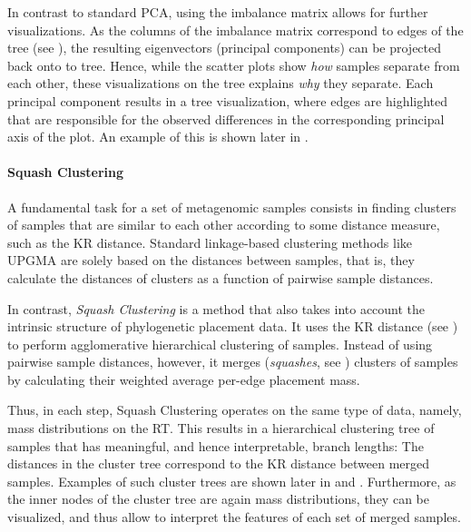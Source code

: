 In contrast to standard PCA, using the imbalance matrix allows for further visualizations.
As the columns of the imbalance matrix correspond to edges of the tree
(see ),
the resulting eigenvectors (principal components) can be projected back onto to tree.
Hence, while the scatter plots show \emph{how} samples separate from each other,
these visualizations on the tree explains \emph{why} they separate.
Each principal component results in a tree visualization,
where edges are highlighted that are responsible for the observed differences
in the corresponding principal axis of the plot.
An example of this is shown later in .

\paragraph{Squash Clustering}
\label{ch:Foundations:sec:PhylogeneticPlacement:sub:ExistingMethods:par:SquashClustering}


A fundamental task for a set of metagenomic samples consists in
finding clusters of samples that are similar to each other according to some distance measure, such as the KR distance.
Standard linkage-based clustering methods like \mbox{UPGMA} %
are solely based on the distances between samples,
that is, they calculate the distances of clusters as a function of pairwise sample distances.

In contrast, \emph{Squash Clustering} \cite{Matsen2011a} is a method that
also takes into account the intrinsic structure of phylogenetic placement data.
It uses the KR distance (see )
to perform agglomerative hierarchical clustering of samples.
Instead of using pairwise sample distances, however,
it merges (\emph{squashes}, see )
clusters of samples by calculating their weighted average per-edge placement mass.

Thus, in each step, Squash Clustering operates on the same type of data, namely, mass distributions on the \ac{RT}.
This results in a hierarchical clustering tree of samples that has meaningful, and hence interpretable, branch lengths:
The distances in the cluster tree correspond to the KR distance between merged samples.
Examples of such cluster trees are shown later in  and .
Furthermore, as the inner nodes of the cluster tree are again mass distributions,
they can be visualized, and thus allow to interpret the features of each set of merged samples.


